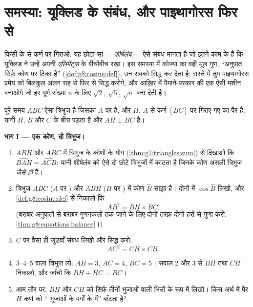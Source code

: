 \section{समस्या: यूक्लिड के संबंध, और पाइथागोरस फिर से}

\begin{problem}[{सप्ताहांत समस्या --- समकोण त्रिभुज का शीर्षलंब:
$AB^2 = BH \times BC$, $AH^2 = BH \times HC$, पाइथागोरस का दूसरा
प्रमाण, और वर्गमूल बनाने वाली एक मशीन}]
\label{pb:g8:cosine:1}
किसी  के  से कर्ण पर  गिराओ: यह छोटा-सा
 --- \emph{शीर्षलंब} --- ऐसे संबंध मानता है जो इतने काम के
हैं कि यूक्लिड ने उन्हें अपनी \emph{एलिमेंट्स} के बीचोंबीच रखा।
इस समस्या में कोज्या का वही मूल गुण, ``अनुपात सिर्फ़ कोण पर टिका
है'' (\cref{def:g8:cosine:def}), उन सबको सिद्ध कर देता है; रास्ते
में तुम पाइथागोरस प्रमेय को बिलकुल अलग राह से फिर से सिद्ध करोगे,
और आख़िर में पैमाने-परकार की एक ऐसी मशीन बनाओगे जो हर पूर्ण संख्या
$n$ के लिए $\sqrt2$, $\sqrt5$, $\sqrt{n}$ बना देती है।

पूरे समय $ABC$ ऐसा त्रिभुज है जिसका $A$ पर  है, और $H$, $A$ से
कर्ण $[BC]$ पर गिराए गए  का पैर है, यानी $H$, $B$ और $C$ के बीच
पड़ता है और $AH \perp BC$ है।

\medskip
\noindent\textbf{भाग I --- एक कोण, दो त्रिभुज।}
\begin{enumerate}
  \item $ABH$ और $ABC$ में त्रिभुज के कोणों के योग
        (\cref{thm:g7:triangles:sum}) से दिखाओ कि
        $\widehat{BAH} = \widehat{ACB}$: यानी शीर्षलंब  को ऐसे दो छोटे त्रिभुजों में काटता है जिनके कोण
        असली त्रिभुज \emph{जैसे ही} हैं।
  \item त्रिभुज $ABC$ ($A$ पर ) और $ABH$ ($H$ पर ) में
        कोण $\widehat B$ साझा है। दोनों में $\cos\widehat B$ लिखो,
        और \cref{def:g8:cosine:def} से निकालो कि
        \[
        AB^2 = BH \times BC .
        \]
        (बराबर अनुपातों से बराबर गुणनफलों तक जाने के लिए दोनों तरफ़
        दोनों हरों से गुणा करो,
        \cref{thm:g8:equations:balance}।)
  \item {} $C$ पर वैसा ही जुड़वाँ संबंध लिखो और सिद्ध करो:
        \[
        AC^2 = CH \times CB .
        \]
  \item $3$--$4$--$5$ वाला त्रिभुज लो: $AB = 3$, $AC = 4$,
        $BC = 5$। सवाल 2 और 3 से $BH$ तथा $CH$ निकालो, और जाँचो कि
        $BH + HC = BC$।
  \item आम तौर पर, $BH$ और $CH$ को सिर्फ़ तीनों भुजाओं वाली भिन्नों
        के रूप में लिखो। किस अर्थ में पैर $H$ कर्ण को ``
        भुजाओं के वर्गों के  में'' बाँटता है?
\end{enumerate}


\end{problem}
